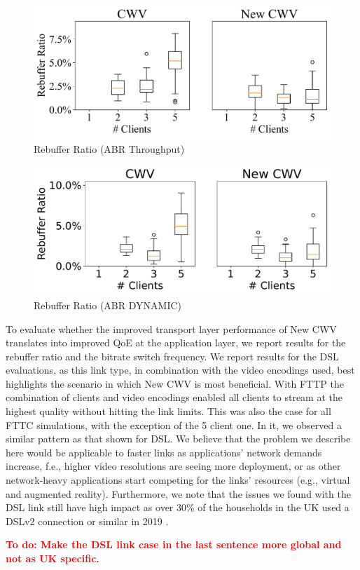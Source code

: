 \documentclass[10pt,sigconf]{acmart}
\newcommand{\todo}[1]{\textbf{\textcolor{red}{To do: #1}}}
\begin{document}
\begin{figure}
      \includegraphics[width=.45\textwidth, keepaspectratio]{figures/Rebuffer_Ratio.pdf}
    \caption{Rebuffer Ratio (ABR Throughput)}
    \label{fig:rebuffer-ratio}
\end{figure}

\begin{figure}
  \includegraphics[width=.45\textwidth, keepaspectratio]{figures/Rebuffer_Ratio_dynamic.pdf}
\caption{Rebuffer Ratio (ABR DYNAMIC)}
\label{fig:rebuffer-ratio-dynamic}
\end{figure}

To evaluate whether the improved transport layer performance of New CWV translates into improved QoE at the application layer, we report results for the rebuffer ratio and the bitrate switch frequency. We report results for the DSL evaluations, as this link type, in combination with the video encodings used, best highlights the scenario in which New CWV is most beneficial. With FTTP the combination of clients and video encodings enabled all clients to stream at the highest quality without hitting the link limits. This was also the case for all FTTC simulations, with the exception of the 5 client one. In it, we observed a similar pattern as that shown for DSL. We believe that the problem we describe here would be applicable to faster links as applications' network demands increase, f.e., higher video resolutions are seeing more deployment, or as other network-heavy applications start competing for the links' resources (e.g., virtual and augmented reality). Furthermore, we note that the issues we found with the DSL link still have high impact as over 30\% of the households in the UK used a DSLv2 connection or similar in 2019 \cite{online-ofcom-report}. 

\todo{Make the DSL link case in the last sentence more global and not as UK specific.}
\end{document}
